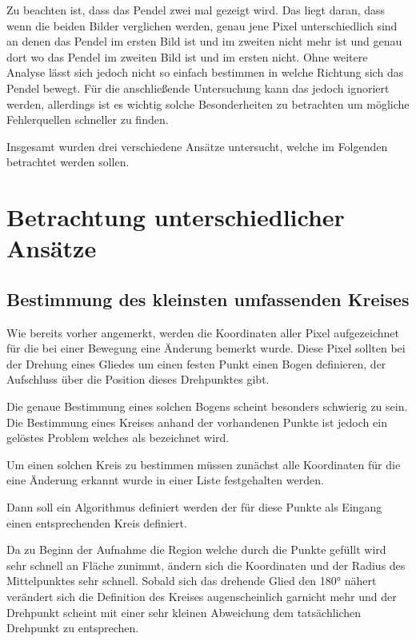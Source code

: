 Zu beachten ist, dass das Pendel zwei mal gezeigt wird.
Das liegt daran, dass wenn die beiden Bilder verglichen werden, genau jene Pixel unterschiedlich sind an denen das Pendel im ersten Bild ist und im zweiten nicht mehr ist und genau dort wo das Pendel im zweiten Bild ist und im ersten nicht.
Ohne weitere Analyse lässt sich jedoch nicht so einfach bestimmen in welche Richtung sich das Pendel bewegt.
Für die anschließende Untersuchung kann das jedoch ignoriert werden, allerdings ist es wichtig solche Besonderheiten zu betrachten um mögliche Fehlerquellen schneller zu finden.


Insgesamt wurden drei verschiedene Ansätze untersucht, welche im Folgenden betrachtet werden sollen.

\section{Betrachtung unterschiedlicher Ansätze}

\subsection{Bestimmung des kleinsten umfassenden Kreises}

Wie bereits vorher angemerkt, werden die Koordinaten aller Pixel aufgezeichnet für die bei einer Bewegung eine Änderung bemerkt wurde.
Diese Pixel sollten bei der Drehung eines Gliedes um einen festen Punkt einen Bogen definieren, der Aufschluss über die Position dieses Drehpunktes gibt.

Die genaue Bestimmung eines solchen Bogens scheint besonders schwierig zu sein.
Die Bestimmung eines Kreises anhand der vorhandenen Punkte ist jedoch ein gelöstes Problem welches als  bezeichnet wird.

Um einen solchen Kreis zu bestimmen müssen zunächst alle Koordinaten für die eine Änderung erkannt wurde in einer Liste festgehalten werden.

Dann soll ein Algorithmus definiert werden der für diese Punkte als Eingang einen entsprechenden Kreis definiert.


Da zu Beginn der Aufnahme die Region welche durch die Punkte gefüllt wird sehr schnell an Fläche zunimmt, ändern sich die Koordinaten und der Radius des Mittelpunktes sehr schnell.
Sobald sich das drehende Glied den 180° nähert verändert sich die Definition des Kreises augenscheinlich garnicht mehr und der Drehpunkt scheint mit einer sehr kleinen Abweichung dem tatsächlichen Drehpunkt zu entsprechen.

